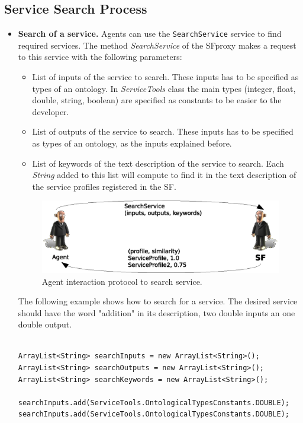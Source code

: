\subsection{Service Search Process}
\begin{itemize}
\item \textbf{Search of a service.} Agents can use the \lstinline|SearchService| service to find required services. The method \textit{SearchService} of the SFproxy makes a request to this service with the following parameters:
  \begin{itemize}
   \item List of inputs of the service to search. These inputs has to be specified as types of an ontology. In \textit{ServiceTools} class the main types (integer, float, double, string, boolean) are specified as constants to be easier to the developer.
   \item List of outputs of the service to search. These inputs has to be specified as types of an ontology, as the inputs explained before.
   \item List of keywords of the text description of the service to search. Each \textit{String} added to this list will compute to find it in the text description of the service profiles registered in the SF.
  \end{itemize}

\begin{figure}[h!t]
	\centering
	\includegraphics[width=.8\textwidth]{Thomas/images/searchService}
	\caption{Agent interaction protocol to search service.}
\end{figure}


The following example shows how to search for a service. The desired service should have the word "addition" in its description, two double inputs an one double output.

\begin{lstlisting}

ArrayList<String> searchInputs = new ArrayList<String>();
ArrayList<String> searchOutputs = new ArrayList<String>();
ArrayList<String> searchKeywords = new ArrayList<String>();

searchInputs.add(ServiceTools.OntologicalTypesConstants.DOUBLE);
searchInputs.add(ServiceTools.OntologicalTypesConstants.DOUBLE);


\end{lstlisting}
\end{itemize}
